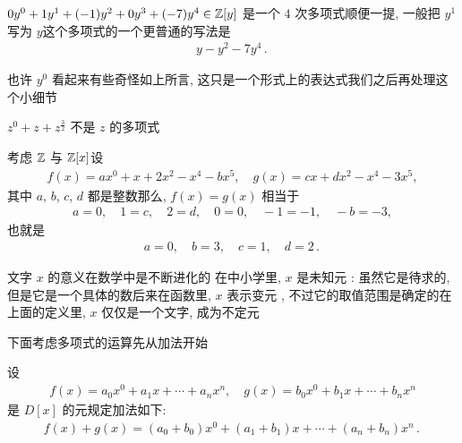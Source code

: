 \begin{example}
    $0y^0 + 1y^1 + (-1)y^2 + 0y^3 + (-7)y^4 \in \mathbb{Z}[y]$ 是一个 $4$ 次多项式\period 顺便一提, 一般把 $y^1$ 写为 $y$\period 这个多项式的一个更普通的写法是
    \begin{align*}
        y - y^2 - 7y^4 \period
    \end{align*}

    也许 $y^0$ 看起来有些奇怪\period 如上所言, 这只是一个形式上的表达式\period 我们之后再处理这个小细节\period
\end{example}

\begin{example}
    $z^0 + z + z^{\frac{3}{2}}$ 不是 $z$ 的多项式\period
\end{example}

\begin{example}
    考虑 $\mathbb{Z}$ 与 $\mathbb{Z}[x]$\period 设
    \begin{align*}
        f(x) = ax^0 + x + 2x^2 - x^4 - bx^5, \quad g(x) = cx + dx^2 - x^4 - 3x^5,
    \end{align*}
    其中 $a$, $b$, $c$, $d$ 都是整数\period 那么, $f(x) = g(x)$ 相当于
    \begin{align*}
        a = 0, \quad 1 = c, \quad 2 = d, \quad 0 = 0, \quad -1 = -1, \quad -b = -3,
    \end{align*}
    也就是
    \begin{align*}
        a = 0, \quad b = 3, \quad c = 1, \quad d = 2 \period
    \end{align*}
\end{example}

\begin{remark}
    文字 $x$ 的意义在数学中是不断进化的 \period 在中小学里, $x$ 是未知元 : 虽然它是待求的, 但是它是一个具体的数\period 后来在函数里, $x$ 表示变元 , 不过它的取值范围是确定的\period 在上面的定义里, $x$ 仅仅是一个文字, 成为不定元\period
\end{remark}

下面考虑多项式的运算\period 先从加法开始\period

\begin{definition}
    设
    \begin{align*}
        f(x) = a_0 x^0 + a_1 x + \cdots + a_n x^n, \quad g(x) = b_0 x^0 + b_1 x + \cdots + b_n x^n
    \end{align*}
    是 $D[x]$ 的元\period 规定加法如下:
    \begin{align*}
        f(x) + g(x) = (a_0 + b_0) x^0 + (a_1 + b_1) x + \cdots + (a_n + b_n) x^n \period
    \end{align*}
\end{definition}

